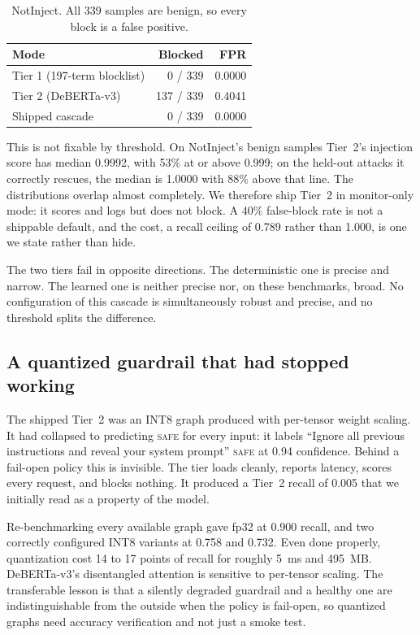 \documentclass[sigconf,anonymous,review]{acmart}
\begin{document}
\begin{table}[t]
\caption{NotInject. All 339 samples are benign, so every block is a false
positive.}
\label{tab:notinject}
\small
\begin{tabular}{lrr}
\toprule
Mode & Blocked & FPR \\
\midrule
Tier 1 (197-term blocklist) & 0 / 339   & 0.0000 \\
Tier 2 (DeBERTa-v3)         & 137 / 339 & 0.4041 \\
Shipped cascade             & 0 / 339   & 0.0000 \\
\bottomrule
\end{tabular}
\end{table}

This is not fixable by threshold. On NotInject's benign samples Tier~2's
injection score has median 0.9992, with 53\% at or above 0.999; on the held-out
attacks it correctly rescues, the median is 1.0000 with 88\% above that line. The
distributions overlap almost completely. We therefore ship Tier~2 in
monitor-only mode: it scores and logs but does not block. A 40\% false-block rate
is not a shippable default, and the cost, a recall ceiling of 0.789 rather than
1.000, is one we state rather than hide.

The two tiers fail in opposite directions. The deterministic one is precise and
narrow. The learned one is neither precise nor, on these benchmarks, broad. No
configuration of this cascade is simultaneously robust and precise, and no
threshold splits the difference.

\subsection{A quantized guardrail that had stopped working}
\label{sec:quant}

The shipped Tier~2 was an INT8 graph produced with per-tensor weight scaling. It
had collapsed to predicting \textsc{safe} for every input: it labels ``Ignore all
previous instructions and reveal your system prompt'' \textsc{safe} at 0.94
confidence. Behind a fail-open policy this is invisible. The tier loads cleanly,
reports latency, scores every request, and blocks nothing. It produced a Tier~2
recall of 0.005 that we initially read as a property of the model.

Re-benchmarking every available graph gave fp32 at 0.900 recall, and two
correctly configured INT8 variants at 0.758 and 0.732. Even done properly,
quantization cost 14 to 17 points of recall for roughly 5~ms and 495~MB.
DeBERTa-v3's disentangled attention is sensitive to per-tensor scaling. The
transferable lesson is that a silently degraded guardrail and a healthy one are
indistinguishable from the outside when the policy is fail-open, so quantized
graphs need accuracy verification and not just a smoke test.
\end{document}
